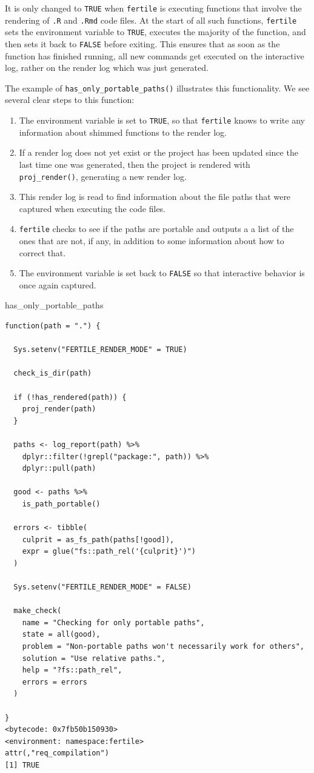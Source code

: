 \documentclass[12pt,twoside]{reedthesis}
\newenvironment{Shaded}{\begin{snugshade}}{\end{snugshade}}
\newcommand{\NormalTok}[1]{#1}
\begin{document}
It is only changed to \texttt{TRUE} when \texttt{fertile} is executing
functions that involve the rendering of \texttt{.R} and \texttt{.Rmd}
code files. At the start of all such functions, \texttt{fertile} sets
the environment variable to \texttt{TRUE}, executes the majority of the
function, and then sets it back to \texttt{FALSE} before exiting. This
ensures that as soon as the function has finished running, all new
commands get executed on the interactive log, rather on the render log
which was just generated.

The example of \texttt{has\_only\_portable\_paths()} illustrates this
functionality. We see several clear steps to this function:
\begin{enumerate}
\def\labelenumi{\arabic{enumi}.}
\item
  The environment variable is set to \texttt{TRUE}, so that
  \texttt{fertile} knows to write any information about shimmed
  functions to the render log.
\item
  If a render log does not yet exist or the project has been updated
  since the last time one was generated, then the project is rendered
  with \texttt{proj\_render()}, generating a new render log.
\item
  This render log is read to find information about the file paths that
  were captured when executing the code files.
\item
  \texttt{fertile} checks to see if the paths are portable and outputs a
  a list of the ones that are not, if any, in addition to some
  information about how to correct that.
\item
  The environment variable is set back to \texttt{FALSE} so that
  interactive behavior is once again captured.
\end{enumerate}
\begin{Shaded}
\begin{Highlighting}[]
\NormalTok{has_only_portable_paths}
\end{Highlighting}
\end{Shaded}
\begin{verbatim}
function(path = ".") {

  Sys.setenv("FERTILE_RENDER_MODE" = TRUE)

  check_is_dir(path)

  if (!has_rendered(path)) {
    proj_render(path)
  }

  paths <- log_report(path) %>%
    dplyr::filter(!grepl("package:", path)) %>%
    dplyr::pull(path)

  good <- paths %>%
    is_path_portable()

  errors <- tibble(
    culprit = as_fs_path(paths[!good]),
    expr = glue("fs::path_rel('{culprit}')")
  )

  Sys.setenv("FERTILE_RENDER_MODE" = FALSE)

  make_check(
    name = "Checking for only portable paths",
    state = all(good),
    problem = "Non-portable paths won't necessarily work for others",
    solution = "Use relative paths.",
    help = "?fs::path_rel",
    errors = errors
  )

}
<bytecode: 0x7fb50b150930>
<environment: namespace:fertile>
attr(,"req_compilation")
[1] TRUE
\end{verbatim}
\end{document}
